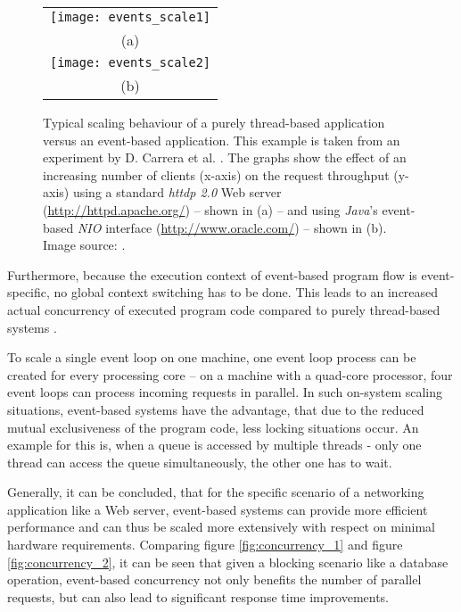 \begin{figure}
\centering\small
\begin{tabular}{c@{\hspace{12mm}}}
  \texttt{[image: events\_scale1]} \\
  (a)
\\[14pt]
  \texttt{[image: events\_scale2]} \\
  (b)
\end{tabular}
\caption{Typical scaling behaviour of a purely thread-based application versus an event-based application. This example is taken from an experiment by D. Carrera et al. \cite{Carrera}. The graphs show the effect of an increasing number of clients (x-axis) on the request throughput (y-axis) using a standard \textit{httdp 2.0} Web server (\url{http://httpd.apache.org/}) -- shown in (a) -- and using \textit{Java}'s event-based \textit{NIO} interface (\url{http://www.oracle.com/}) -- shown in (b). Image source: \cite{Carrera}.} 
\label{fig:events_scale}
\end{figure}

Furthermore, because the execution context of event-based program flow is event-specific, no global context switching has to be done. This leads to an increased actual concurrency of executed program code compared to purely thread-based systems \cite{Lee2006}.
 
To scale a single event loop on one machine, one event loop process can be created for every processing core -- on a machine with a quad-core processor, four event loops can process incoming requests in parallel. In such on-system scaling situations, event-based systems have the advantage, that due to the reduced mutual exclusiveness of the program code, less locking situations occur. An example for this is, when a queue is accessed by multiple threads - only one thread can access the queue simultaneously, the other one has to wait.

Generally, it can be concluded, that for the specific scenario of a networking application like a Web server, event-based systems can provide more efficient performance and can thus be scaled more extensively with respect on minimal hardware requirements. Comparing figure \ref{fig:concurrency_1} and figure \ref{fig:concurrency_2}, it can be seen that given a blocking scenario like a database operation, event-based concurrency not only benefits the number of parallel requests, but can also lead to significant response time improvements.

